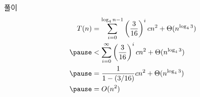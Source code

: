 \documentclass[10pt]{beamer}
\begin{document}
\begin{frame}[fragile]{풀이}
    \[
        \begin{aligned}
            T(n) &= \sum_{i=0}^{\log_4 n-1} \left( \dfrac{3}{16} \right)  ^i cn^2 + \Theta(n^{\log_4 3}) \\ \pause
            &<  \sum_{i=0}^{\infty} \left( \dfrac{3}{16} \right)^i cn^2 + \Theta(n^{\log_4 3}) \\ \pause
            &= \dfrac{1}{1-(3/16)}cn^2 + \Theta(n^{\log_4 3})\\ \pause
            &= O(n^2)
        \end{aligned}
    \]
\end{frame}
\end{document}
